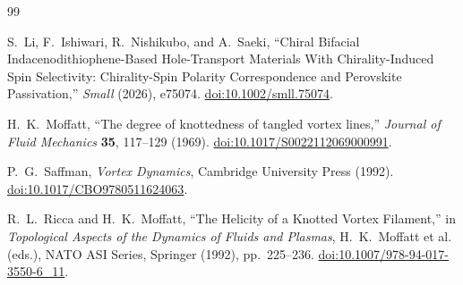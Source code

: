 \begin{thebibliography}{99}

S.~Li, F.~Ishiwari, R.~Nishikubo, and A.~Saeki,
``Chiral Bifacial Indacenodithiophene-Based Hole-Transport Materials With Chirality-Induced Spin Selectivity: Chirality-Spin Polarity Correspondence and Perovskite Passivation,''
\textit{Small} (2026), e75074.
\href{https://doi.org/10.1002/smll.75074}{doi:10.1002/smll.75074}.

H.~K.~Moffatt,
``The degree of knottedness of tangled vortex lines,''
\textit{Journal of Fluid Mechanics} \textbf{35}, 117--129 (1969).
\href{https://doi.org/10.1017/S0022112069000991}{doi:10.1017/S0022112069000991}.

P.~G.~Saffman,
\textit{Vortex Dynamics}, Cambridge University Press (1992).
\href{https://doi.org/10.1017/CBO9780511624063}{doi:10.1017/CBO9780511624063}.

R.~L.~Ricca and H.~K.~Moffatt,
``The Helicity of a Knotted Vortex Filament,''
in \textit{Topological Aspects of the Dynamics of Fluids and Plasmas},
H.~K.~Moffatt et al. (eds.), NATO ASI Series, Springer (1992), pp.~225--236.
\href{https://doi.org/10.1007/978-94-017-3550-6_11}{doi:10.1007/978-94-017-3550-6_11}.

\end{thebibliography}
